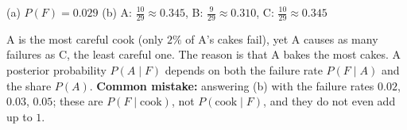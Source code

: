 \begin{solution}
	\begin{answer}
		(a) $P(F)=0.029$ \quad (b) A: $\frac{10}{29}\approx0.345$, B:
		$\frac{9}{29}\approx0.310$, C: $\frac{10}{29}\approx0.345$
	\end{answer}
	\begin{remark}
		A is the most careful cook (only $2\%$ of A's cakes fail), yet A causes
		as many failures as C, the least careful one. The reason is that A bakes
		the most cakes. A posterior probability $P(A\mid F)$ depends on both the
		failure rate $P(F\mid A)$ and the share $P(A)$.
		\textbf{Common mistake:} answering (b) with the failure rates $0.02$,
		$0.03$, $0.05$; these are $P(F\mid\text{cook})$, not
		$P(\text{cook}\mid F)$, and they do not even add up to $1$.
	\end{remark}
\end{solution}
